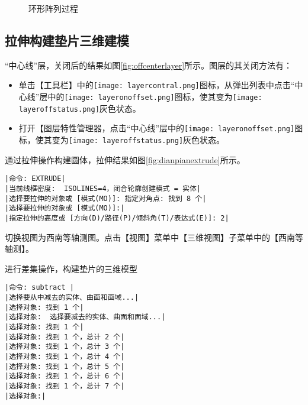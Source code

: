 \showremarks
\begin{figure}[htbp]
\centering
{}\hspace{20pt}
\hspace{20pt}
\caption{环形阵列过程}
\end{figure}

\subsection{拉伸构建垫片三维建模}
\begin{procedure}
“中心线”层，关闭后的结果如图\ref{fig:offcenterlayer}所示。图层的其关闭方法有：
\begin{itemize}
\item 单击【工具栏】中的\texttt{[image: layercontral.png]}图标，从弹出列表中点击“中心线”层中的\texttt{[image: layeronoffset.png]}图标，使其变为\texttt{[image: layeroffstatus.png]}灰色状态。
\item 打开【图层特性管理器，点击“中心线”层中的\texttt{[image: layeronoffset.png]}图标，使其变为\texttt{[image: layeroffstatus.png]}灰色状态。
\end{itemize}
\item 通过拉伸操作构建圆体，拉伸结果如图\ref{fig:dianpianextrude}所示。
\begin{lstlisting}
|命令: EXTRUDE|
|当前线框密度:  ISOLINES=4，闭合轮廓创建模式 = 实体|
|选择要拉伸的对象或 [模式(MO)]: 指定对角点: 找到 8 个|
|选择要拉伸的对象或 [模式(MO)]:|
|指定拉伸的高度或 [方向(D)/路径(P)/倾斜角(T)/表达式(E)]: 2|
\end{lstlisting}
\item 切换视图为西南等轴测图。点击【视图】菜单中【三维视图】子菜单中的【西南等轴测】。
\item 进行差集操作，构建垫片的三维模型
\begin{lstlisting}
|命令: subtract |
|选择要从中减去的实体、曲面和面域...|
|选择对象: 找到 1 个|
|选择对象:  选择要减去的实体、曲面和面域...|
|选择对象: 找到 1 个|
|选择对象: 找到 1 个，总计 2 个|
|选择对象: 找到 1 个，总计 3 个|
|选择对象: 找到 1 个，总计 4 个|
|选择对象: 找到 1 个，总计 5 个|
|选择对象: 找到 1 个，总计 6 个|
|选择对象: 找到 1 个，总计 7 个|
|选择对象:|
\end{lstlisting}

\end{procedure}
